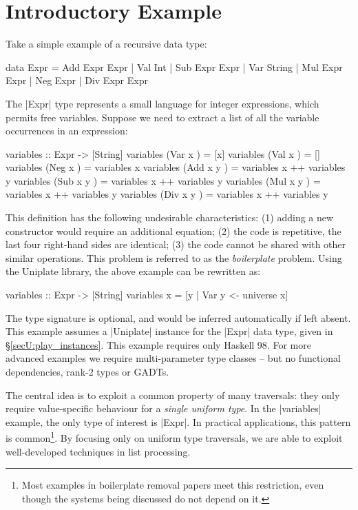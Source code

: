 \section{Introductory Example}
\label{secU:intro}

Take a simple example of a recursive data type:

\begin{code}
data Expr  =  Add  Expr  Expr  |  Val  Int
           |  Sub  Expr  Expr  |  Var  String
           |  Mul  Expr  Expr  |  Neg  Expr
           |  Div  Expr  Expr
\end{code}

The |Expr| type represents a small language for integer expressions, which permits free variables. Suppose we need to extract a list of all the variable occurrences in an expression:

\begin{code}
variables :: Expr -> [String]
variables (Var  x    ) = [x]
variables (Val  x    ) = []
variables (Neg  x    ) = variables x
variables (Add  x y  ) = variables x ++ variables y
variables (Sub  x y  ) = variables x ++ variables y
variables (Mul  x y  ) = variables x ++ variables y
variables (Div  x y  ) = variables x ++ variables y
\end{code}

This definition has the following undesirable characteristics: (1) adding a new constructor would require an additional equation; (2) the code is repetitive, the last four right-hand sides are identical; (3) the code cannot be shared with other similar operations. This problem is referred to as the \textit{boilerplate} problem. Using the Uniplate library, the above example can be rewritten as:

\begin{code}
variables :: Expr -> [String]
variables x = [y | Var y <- universe x]
\end{code}

The type signature is optional, and would be inferred automatically if left absent. This example assumes a |Uniplate| instance for the |Expr| data type, given in \S\ref{secU:play_instances}. This example requires only Haskell 98. For more advanced examples we require multi-parameter type classes -- but no functional dependencies, rank-2 types or GADTs.

The central idea is to exploit a common property of many traversals: they only require value-specific behaviour for a \textit{single uniform type}. In the |variables| example, the only type of interest is |Expr|. In practical applications, this pattern is common\footnote{Most examples in boilerplate removal papers meet this restriction, even though the systems being discussed do not depend on it.}. By focusing only on uniform type traversals, we are able to exploit well-developed techniques in list processing.

